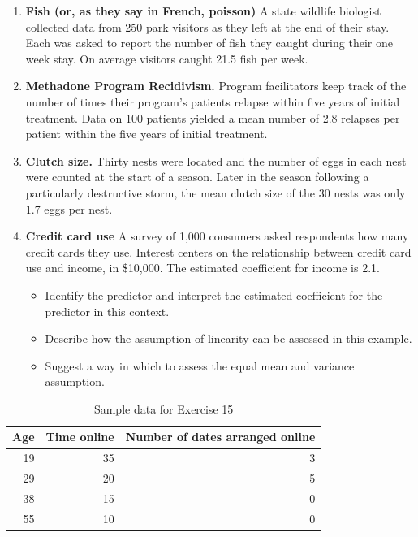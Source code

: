 \documentclass[
]{krantz}
\providecommand{\tightlist}{%
  \setlength{\itemsep}{0pt}\setlength{\parskip}{0pt}}
\begin{document}
\begin{enumerate}
\def\labelenumi{\arabic{enumi}.}
\setcounter{enumi}{10}
\item
  \textbf{Fish (or, as they say in French, poisson)} A state wildlife biologist collected data from 250 park visitors as they left at the end of their stay. Each was asked to report the number of fish they caught during their one week stay. On average visitors caught 21.5 fish per week.
\item
  \textbf{Methadone Program Recidivism.} Program facilitators keep track of the number of times their program's patients relapse within five years of initial treatment. Data on 100 patients yielded a mean number of 2.8 relapses per patient within the five years of initial treatment.
\item
  \textbf{Clutch size.} Thirty nests were located and the number of eggs in each nest were counted at the start of a season. Later in the season following a particularly destructive storm, the mean clutch size of the 30 nests was only 1.7 eggs per nest.
  \vspace{3mm}
\item
  \textbf{Credit card use} A survey of 1,000 consumers asked respondents how many credit cards they use. Interest centers on the relationship between credit card use and income, in \$10,000. The estimated coefficient for income is 2.1.

  \begin{itemize}
  \tightlist
  \item
    Identify the predictor and interpret the estimated coefficient for the predictor in this context.
  \item
    Describe how the assumption of linearity can be assessed in this example.
  \item
    Suggest a way in which to assess the equal mean and variance assumption.
  \end{itemize}
\end{enumerate}

\begin{table}

\caption{\label{tab:tab2chp4}Sample data for Exercise 15}
\centering
\begin{tabular}[t]{rrr}
\toprule
Age & Time online & Number of dates arranged online\\
\midrule
19 & 35 & 3\\
29 & 20 & 5\\
38 & 15 & 0\\
55 & 10 & 0\\
\bottomrule
\end{tabular}
\end{table}
\end{document}
